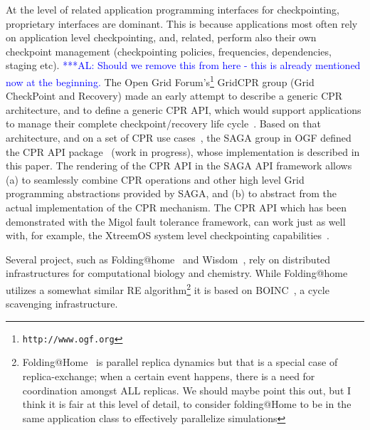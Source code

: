 \documentclass[times, 10pt, twocolumn]{article}
\newcommand{\kimnote}[1]{ {\textcolor{green} { ***JK: #1 }}}
\newcommand{\alnote}[1]{ {\textcolor{blue} { ***AL: #1 }}}
\newcommand{\jhanote}[1]{ {\textcolor{red} { ***SJ: #1 }}}
\newcommand{\kimnote}[1]{}
\newcommand{\alnote}[1]{}
\newcommand{\jhanote}[1]{}
\begin{document}
At the level of related application programming interfaces for
checkpointing, proprietary interfaces are dominant. This is because
applications most often rely on application level checkpointing, and,
related, perform also their own checkpoint management (checkpointing
policies, frequencies, dependencies, staging etc).  \alnote{Should we
  remove this from here - this is already mentioned now at the
  beginning.}  The Open Grid
Forum's\footnote{\texttt{http://www.ogf.org}} GridCPR group (Grid
CheckPoint and Recovery) made an early attempt to describe a generic
CPR architecture, and to define a generic CPR API, which would support
applications to manage their complete checkpoint/recovery life
cycle~\cite{ogf_cpr_arch}.  Based on that architecture, and on a set
of CPR use cases~\cite{ogf_cpr_uc}, the SAGA group in OGF defined the
CPR API package~\cite{saga_cpr_draft} (work in progress), whose
implementation is described in this paper.  The rendering of the CPR
API in the SAGA API framework allows (a) to seamlessly combine CPR
operations and other high level Grid programming abstractions provided
by SAGA, and (b) to abstract from the actual implementation of the CPR
mechanism.  The CPR API which has been demonstrated with the Migol
fault tolerance framework, can work just as well with, for example,
the XtreemOS system level checkpointing
capabilities~\cite{xtreemos_cpr}.


Several project, such as Folding@home~\cite{folding} and
Wisdom~\cite{wisdom}, rely on distributed infrastructures for
computational biology and chemistry. While
Folding@home~\cite{PhysRevLett.86.4983} utilizes a somewhat similar RE
algorithm\footnote{Folding@Home~\cite{PhysRevLett.86.4983} is parallel
  replica dynamics but that is a special case of replica-exchange;
  when a certain event happens, there is a need for coordination
  amongst ALL replicas. We should maybe point this out, but I think it
  is fair at this level of detail, to consider folding@Home to be in
  the same application class to effectively parallelize simulations}
it is based on BOINC~\cite{1033223}, a cycle scavenging
infrastructure.

\end{document}

